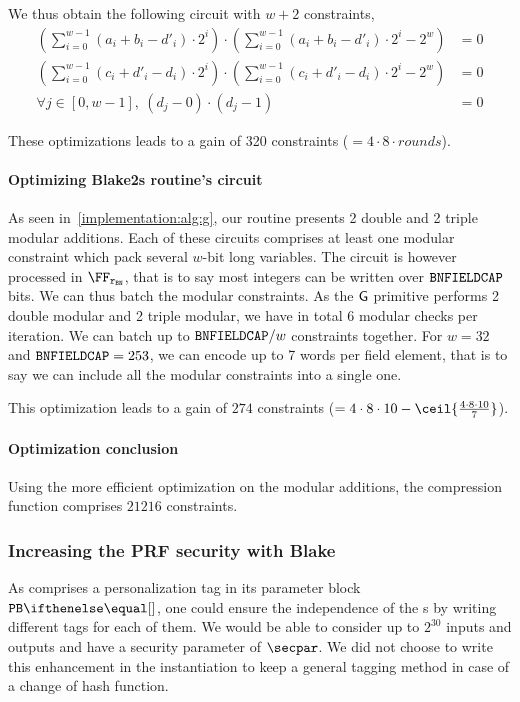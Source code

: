 We thus obtain the following circuit with $w+2$ constraints,
\begin{align*}
  \left ( \sum_{i=0}^{w - 1} ( a_i + b_i - d'_i ) \cdot 2^i \right ) \cdot \left ( \sum_{i=0}^{w - 1} ( a_i + b_i - d'_i ) \cdot 2^i - 2^w \right ) &= 0 \\
  \left ( \sum_{i=0}^{w - 1} ( c_i + d'_i - d_i ) \cdot 2^i \right ) \cdot \left ( \sum_{i=0}^{w - 1} ( c_i + d'_i - d_i ) \cdot 2^i - 2^w \right ) &= 0 \\
  \forall j \in [0, w - 1],\ (d_j - 0) \cdot (d_j - 1 ) &= 0
\end{align*}

These optimizations leads to a gain of 320 constraints ($=4 \cdot 8 \cdot rounds$).

\paragraph{Optimizing Blake2s routine's circuit}\label{implementation:efficiency:blake:optimization:batch-constraints}

As seen in~\cref{implementation:alg:g}, our routine presents 2 double and 2 triple modular additions. Each of these circuits comprises at least one modular constraint which pack several $w$-bit long variables.
The circuit is however processed in	$\FFx{\rBN}$, that is to say most integers can be written over $\mathtt{BNFIELDCAP}$ bits. We can thus batch the modular constraints.
As the $\mathsf{G}$ primitive performs 2 double modular and 2 triple modular, we have in total 6 modular checks per iteration. We can batch up to $\mathtt{BNFIELDCAP} / w$ constraints together. For $w=32$ and $\mathtt{BNFIELDCAP}=253$, we can encode up to 7 words per field element, that is to say we can include all the modular constraints into a single one.

This optimization leads to a gain of $274$ constraints ($= 4\cdot8\cdot10-\ceil{\frac{4\cdot8\cdot10}{7}}$).

\paragraph{Optimization conclusion}\label{implementation:efficiency:blake:optimization:conclusion}

Using the more efficient optimization on the modular additions, the  compression function comprises $21216$ constraints.

\subsubsection{Increasing the PRF security with Blake}\label{implementation:efficiency:blake-prf}

As  comprises a personalization tag in its parameter block $\blakePB{}$, one could ensure the independence of the \prf{}s by writing different tags for each of them. We would be able to consider up to $2^{30}$ inputs and outputs and have a security parameter of $\secpar$.
We did not choose to write this enhancement in the instantiation to keep a general tagging method in case of a change of hash function.
